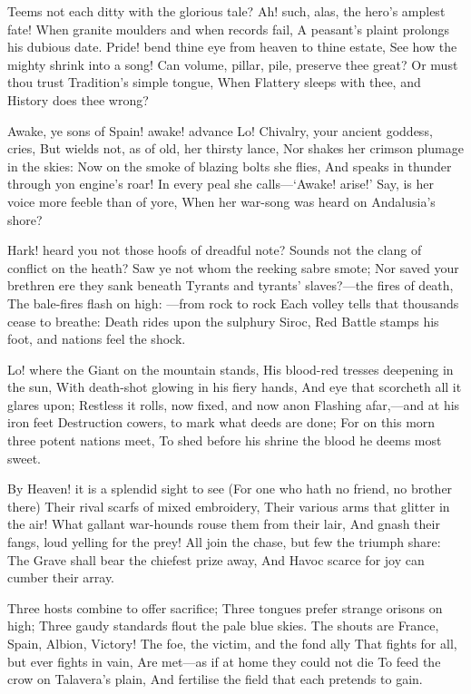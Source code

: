 \documentclass[10pt,twocolumn]{book}
\begin{document}
   Teems not each ditty with the glorious tale?
   Ah! such, alas, the hero's amplest fate!
   When granite moulders and when records fail,
   A peasant's plaint prolongs his dubious date.
   Pride! bend thine eye from heaven to thine estate,
   See how the mighty shrink into a song!
   Can volume, pillar, pile, preserve thee great?
   Or must thou trust Tradition's simple tongue,
When Flattery sleeps with thee, and History does thee wrong?


   Awake, ye sons of Spain! awake! advance
   Lo! Chivalry, your ancient goddess, cries,
   But wields not, as of old, her thirsty lance,
   Nor shakes her crimson plumage in the skies:
   Now on the smoke of blazing bolts she flies,
   And speaks in thunder through yon engine's roar!
   In every peal she calls---`Awake! arise!'
   Say, is her voice more feeble than of yore,
When her war-song was heard on Andalusia's shore?


   Hark! heard you not those hoofs of dreadful note?
   Sounds not the clang of conflict on the heath?
   Saw ye not whom the reeking sabre smote;
   Nor saved your brethren ere they sank beneath
   Tyrants and tyrants' slaves?---the fires of death,
   The bale-fires flash on high: ---from rock to rock
   Each volley tells that thousands cease to breathe:
   Death rides upon the sulphury Siroc,
Red Battle stamps his foot, and nations feel the shock.


   Lo! where the Giant on the mountain stands,
   His blood-red tresses deepening in the sun,
   With death-shot glowing in his fiery hands,
   And eye that scorcheth all it glares upon;
   Restless it rolls, now fixed, and now anon
   Flashing afar,---and at his iron feet
   Destruction cowers, to mark what deeds are done;
   For on this morn three potent nations meet,
To shed before his shrine the blood he deems most sweet.


   By Heaven! it is a splendid sight to see
   (For one who hath no friend, no brother there)
   Their rival scarfs of mixed embroidery,
   Their various arms that glitter in the air!
   What gallant war-hounds rouse them from their lair,
   And gnash their fangs, loud yelling for the prey!
   All join the chase, but few the triumph share:
   The Grave shall bear the chiefest prize away,
And Havoc scarce for joy can cumber their array.


   Three hosts combine to offer sacrifice;
   Three tongues prefer strange orisons on high;
   Three gaudy standards flout the pale blue skies.
   The shouts are France, Spain, Albion, Victory!
   The foe, the victim, and the fond ally
   That fights for all, but ever fights in vain,
   Are met---as if at home they could not die\textemdash
   To feed the crow on Talavera's plain,
And fertilise the field that each pretends to gain.
\end{document}
